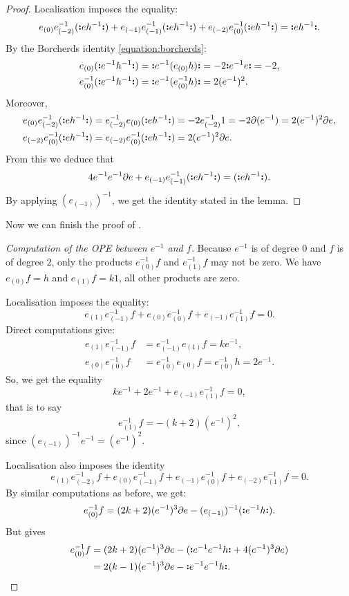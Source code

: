 \begin{proof}
	Localisation imposes the equality:
	\[ e_{(0)} e^{-1}_{(-2)} (\NO{e h^{-1}}) + e_{(-1)} e^{-1}_{(-1)} (\NO{e h^{-1}}) + e_{(-2)} e^{-1}_{(0)} (\NO{e h^{-1}}) = \NO{e h^{-1}}. \]
	By the Borcherds identity \eqref{equation:borcherds}:
	\[ \begin{aligned}
		e_{(0)}(\NO{e^{-1} h^{-1}}) & = \NO{e^{-1} (e_{(0)} h)} = - 2 \NO{e^{-1}e } = - 2, \\
		e^{-1}_{(0)}(\NO{e^{-1} h^{-1}}) & = \NO{e^{-1} (e^{-1}_{(0)} h)} = 2 (e^{-1})^2.
	\end{aligned} \]
	Moreover,
	\[ \begin{aligned}
		e_{(0)} e^{-1}_{(-2)} (\NO{e h^{-1}}) & = e^{-1}_{(-2)} e_{(0)} (\NO{e h^{-1}}) = - 2 e^{-1}_{(-2)}1 = - 2 \partial(e^{-1}) = 2 (e^{-1})^2 \partial e, \\
		e_{(-2)} e^{-1}_{(0)} (\NO{e h^{-1}}) & =e_{(-2)} e^{-1}_{(0)}   (\NO{e h^{-1}}) = 2 (e^{-1})^2 \partial e.
	\end{aligned} \]
	From this we deduce that
	\[ 4 e^{-1}e^{-1} \partial e + e_{(-1)} e^{-1}_{(-1)} (\NO{e h^{-1}})  = (\NO{e h^{-1}}). \]
	By applying $(e_{(-1)})^{-1}$, we get the identity stated in the lemma.
\end{proof}

Now we can finish the proof of .

\begin{proof}[Computation of the OPE between $e^{-1}$ and $f$]
	Because $e^{-1}$ is of degree $0$ and $f$ is of degree $2$, only the products $e^{-1}_{(0)}f$ and $e^{-1}_{(1)}f$ may not be zero. We have $e_{(0)} f = h$ and $e_{(1)} f = k 1$, all other products are zero.
	
	Localisation imposes the equality:
	\[ e_{(1)} e^{-1}_{(-1)} f + e_{(0)} e^{-1}_{(0)} f + e_{(-1)} e^{-1}_{(1)} f = 0. \]
	Direct computations give:
	\[ \begin{aligned}
		e_{(1)} e^{-1}_{(-1)} f & = e^{-1}_{(-1)} e_{(1)} f = k e^{-1}, \\
		e_{(0)} e^{-1}_{(0)} f & = e^{-1}_{(0)} e_{(0)} f = e^{-1}_{(0)} h = 2 e^{-1}.
	\end{aligned}  \]
	So, we get the equality
	\[ k e^{-1} + 2 e^{-1} + e_{(-1)} e^{-1}_{(1)} f = 0, \]
	that is to say
	\[ e^{-1}_{(1)} f  = - (k + 2) (e^{-1})^2, \]
	since $(e_{(-1)})^{-1} e^{-1} = (e^{-1})^2$.
	
	Localisation also imposes the identity
	\[ e_{(1)} e^{-1}_{(-2)} f + e_{(0)} e^{-1}_{(-1)} f + e_{(-1)} e^{-1}_{(0)} f + e_{(-2)} e^{-1}_{(1)} f = 0. \]
	By similar computations as before, we get:
	\[ e^{-1}_{(0)} f = (2 k + 2)(e^{-1})^3 \partial e - (e_{(-1)})^{-1} (\NO{e^{-1} h}). \]
	But  gives
	\[ \begin{aligned}
		e^{-1}_{(0)} f & = (2 k + 2) (e^{-1})^3 \partial e - (\NO{e^{-1} e^{-1} h} + 4 (e^{-1})^3 \partial e) \\
		& = 2 (k - 1) (e^{-1})^3 \partial e - \NO{e^{-1} e^{-1} h}.
	\end{aligned} \]
\end{proof}



